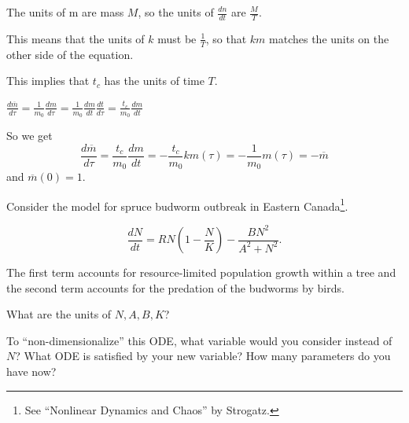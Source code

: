 \documentclass{workbook}
\begin{document}
\begin{solution}
\begin{slide}

\begin{parts}
	\item The units of m are mass $M$, so the units of $\frac{dn}{dt}$ are $\frac{M}{T}$.
	
	This means that the units of $k$ must be $\frac{1}{T}$, so that $km$ matches the units on the other side of the equation.
	
	This implies that $t_c$ has the units of time $T$.
	
	\item $\displaystyle\frac{d\overline{m}}{d\tau} = \frac{1}{m_0} \frac{dm}{d\tau} = \frac{1}{m_0} \frac{dm}{dt} \frac{dt}{d\tau} = \frac{t_c}{m_0} \frac{dm}{dt}$
	
	So we get 
	\[
	\frac{d\overline{m}}{d\tau} 
		= \frac{t_c}{m_0} \frac{dm}{dt} 
		= -\frac{t_c}{m_0} k m(\tau)
		= -\frac{1}{m_0} m(\tau)
		= - \overline{m}
	\]
	and $\overline{m}(0)=1$.
	
\end{parts}
\end{slide}

\end{solution}

	







\begin{slide}
\question \label{q:budworms}
	
\begin{problem}
Consider the model for spruce budworm outbreak in Eastern Canada\footnote{See ``Nonlinear Dynamics and Chaos'' by Strogatz.}.

\[
\frac{dN}{dt} = R N \left( 1 - \frac{N}{K} \right) - \frac{B N^2}{A^2 + N^2}.
\]

The first term accounts for resource-limited population growth within a tree and the second term accounts for the predation of the budworms by birds.
\end{problem}

\begin{parts}
	\item What are the units of $N, A, B, K$?
	


	\item To ``non-dimensionalize'' this ODE, what variable would you consider instead of $N$?  What ODE is satisfied by your new variable? How many parameters do you have now?
	

	
\end{parts}

\end{slide}
\end{document}
